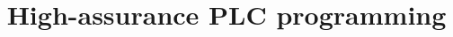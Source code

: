\documentclass{article}
\begin{document}
\title{High-assurance PLC programming}
\author{}

\maketitle



\printbibliography
\end{document}
